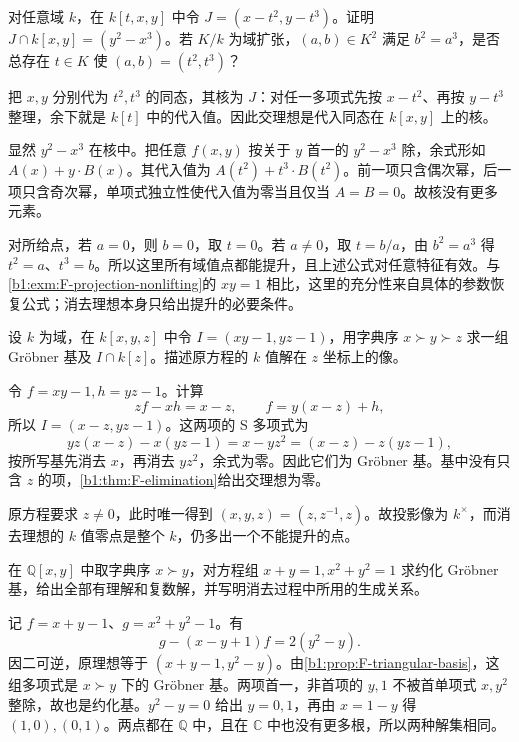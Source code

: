 \begin{exercise}\label{b1:ex:F-cusp-parameter}
	对任意域 \(k\)，在 \(k[t,x,y]\) 中令 \(J=(x-t^2,y-t^3)\)。证明 \(J\cap k[x,y]=(y^2-x^3)\)。若 \(K/k\) 为域扩张，\((a,b)\in K^2\) 满足 \(b^2=a^3\)，是否总存在 \(t\in K\) 使 \((a,b)=(t^2,t^3)\)？
\end{exercise}
\begin{solution}
	把 \(x,y\) 分别代为 \(t^2,t^3\) 的同态，其核为 \(J\)：对任一多项式先按 \(x-t^2\)、再按 \(y-t^3\) 整理，余下就是 \(k[t]\) 中的代入值。因此交理想是代入同态在 \(k[x,y]\) 上的核。

	显然 \(y^2-x^3\) 在核中。把任意 \(f(x,y)\) 按关于 \(y\) 首一的 \(y^2-x^3\) 除，余式形如 \(A(x)+y\cdot B(x)\)。其代入值为 \(A(t^2)+t^3\cdot B(t^2)\)。前一项只含偶次幂，后一项只含奇次幂，单项式独立性使代入值为零当且仅当 \(A=B=0\)。故核没有更多元素。

	对所给点，若 \(a=0\)，则 \(b=0\)，取 \(t=0\)。若 \(a\ne0\)，取 \(t=b/a\)，由 \(b^2=a^3\) 得 \(t^2=a\)、\(t^3=b\)。所以这里所有域值点都能提升，且上述公式对任意特征有效。与\cref{b1:exm:F-projection-nonlifting}的 \(xy=1\) 相比，这里的充分性来自具体的参数恢复公式；消去理想本身只给出提升的必要条件。
\end{solution}

\begin{exercise}\label{b1:ex:F-three-variable-projection}
	设 \(k\) 为域，在 \(k[x,y,z]\) 中令 \(I=(xy-1,yz-1)\)，用字典序 \(x\succ y\succ z\) 求一组 Gröbner 基及 \(I\cap k[z]\)。描述原方程的 \(k\) 值解在 \(z\) 坐标上的像。
\end{exercise}
\begin{solution}
	令 \(f=xy-1,h=yz-1\)。计算
	\[
		zf-xh=x-z, \qquad f=y(x-z)+h,
	\]
	所以 \(I=(x-z,yz-1)\)。这两项的 S 多项式为
	\[
		yz(x-z)-x(yz-1)=x-yz^2=(x-z)-z(yz-1),
	\]
	按所写基先消去 \(x\)，再消去 \(yz^2\)，余式为零。因此它们为 Gröbner 基。基中没有只含 \(z\) 的项，\cref{b1:thm:F-elimination}给出交理想为零。

	原方程要求 \(z\ne0\)，此时唯一得到 \((x,y,z)=(z,z^{-1},z)\)。故投影像为 \(k^\times\)，而消去理想的 \(k\) 值零点是整个 \(k\)，仍多出一个不能提升的点。
\end{solution}

\begin{exercise}\label{b1:ex:F-two-equations}
	在 \(\mathbb Q[x,y]\) 中取字典序 \(x\succ y\)，对方程组 \(x+y=1,x^2+y^2=1\) 求约化 Gröbner 基，给出全部有理解和复数解，并写明消去过程中所用的生成关系。
\end{exercise}
\begin{solution}
	记 \(f=x+y-1\)、\(g=x^2+y^2-1\)。有
	\[
		g-(x-y+1)f=2(y^2-y).
	\]
	因二可逆，原理想等于 \((x+y-1,y^2-y)\)。由\cref{b1:prop:F-triangular-basis}，这组多项式是 \(x\succ y\) 下的 Gröbner 基。两项首一，非首项的 \(y,1\) 不被首单项式 \(x,y^2\) 整除，故也是约化基。\(y^2-y=0\) 给出 \(y=0,1\)，再由 \(x=1-y\) 得 \((1,0),(0,1)\)。两点都在 \(\mathbb Q\) 中，且在 \(\mathbb C\) 中也没有更多根，所以两种解集相同。
\end{solution}

